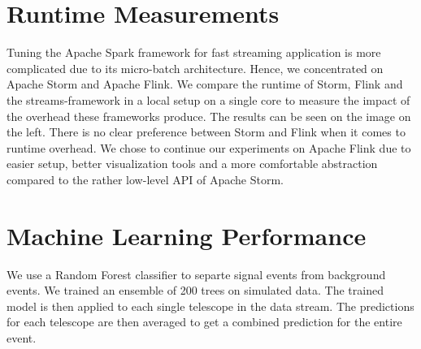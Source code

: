 \documentclass[11pt,twoside]{article}
\begin{document}
\section{Runtime Measurements}

Tuning the Apache Spark framework for fast streaming application is more complicated due to its micro-batch architecture.
Hence, we concentrated on Apache Storm\cite{storm} and Apache Flink\cite{flink}. We compare the runtime of Storm, Flink and the streams-framework\cite{streams} in
a local setup on a single core to measure the impact of the overhead these frameworks produce.
The results can be seen on the image on the left.
There is no clear preference between Storm and Flink when it comes to runtime overhead. We chose to continue our experiments on
Apache Flink due to easier setup, better visualization tools and a more comfortable abstraction compared to the rather low-level
API of Apache Storm.



\section{Machine Learning Performance}

We use a Random Forest classifier to separte signal events from background events. We trained an ensemble of 200 trees
on simulated data. The trained model is then applied to each single telescope in the data stream. The predictions
for each telescope are then averaged to get a combined prediction for the entire event.






\end{document}
